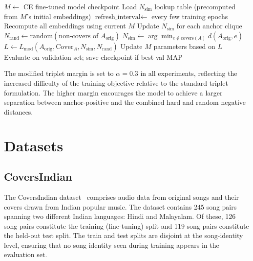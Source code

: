 \documentclass[conference]{IEEEtran}
\begin{document}
\begin{algorithm}[htbp]
\caption{Dynamic Modified Triplet Loss Fine-Tuning}
\label{alg:dyn_triplet}
\begin{algorithmic}[1]
\STATE $M \leftarrow$ CE fine-tuned model checkpoint
\STATE Load $N_{\text{sim}}$ lookup table (precomputed from $M$'s initial embeddings)
\STATE $\text{refresh\_interval} \leftarrow$ every few training epochs
        \STATE Recompute all embeddings using current $M$
        \STATE Update $N_{\text{sim}}$ for each anchor clique
    \ENDIF
        \STATE $N_{\text{rand}} \leftarrow \text{random}(\text{non-covers of } A_{\text{orig}})$
        \STATE $N_{\text{sim}} \leftarrow \arg\min_{e \notin \text{covers}(A)} d(A_{\text{orig}}, e)$
        \STATE $L \leftarrow L_{\text{mod}}(A_{\text{orig}}, \text{Cover}_A, N_{\text{sim}}, N_{\text{rand}})$
        \STATE Update $M$ parameters based on $L$
    \ENDFOR
    \STATE Evaluate on validation set; save checkpoint if best val MAP
\ENDFOR
\end{algorithmic}
\end{algorithm}

The modified triplet margin is set to $\alpha = 0.3$ in all experiments, reflecting the increased difficulty of the training objective relative to the standard triplet formulation. The higher margin encourages the model to achieve a larger separation between anchor-positive and the combined hard and random negative distances.


\section{Datasets}

\subsection{CoversIndian}

The CoversIndian dataset~\cite{ismir_paper} comprises audio data from original songs and their covers drawn from Indian popular music. The dataset contains 245 song pairs spanning two different Indian languages: Hindi and Malayalam. Of these, 126 song pairs constitute the training (fine-tuning) split and 119 song pairs constitute the held-out test split. The train and test splits are disjoint at the song-identity level, ensuring that no song identity seen during training appears in the evaluation set.
\end{document}

